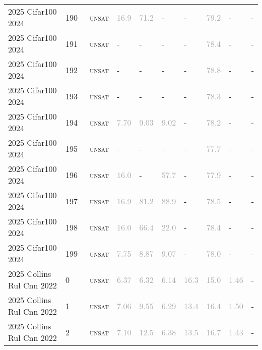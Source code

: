 \begin{center}
{\begin{longtable}{@{}llllllllll@{}}
2025 Cifar100 2024 & 190 & ~\textsc{unsat} & \textcolor{darkgray}{16.9} & \textcolor{darkgray}{71.2} & - & - & \textcolor{darkgray}{79.2} & - & - \\
2025 Cifar100 2024 & 191 & ~\textsc{unsat} & - & - & - & - & \textcolor{darkgray}{78.4} & - & - \\
2025 Cifar100 2024 & 192 & ~\textsc{unsat} & - & - & - & - & \textcolor{darkgray}{78.8} & - & - \\
2025 Cifar100 2024 & 193 & ~\textsc{unsat} & - & - & - & - & \textcolor{darkgray}{78.3} & - & - \\
2025 Cifar100 2024 & 194 & ~\textsc{unsat} & \textcolor{darkgray}{7.70} & \textcolor{darkgray}{9.03} & \textcolor{darkgray}{9.02} & - & \textcolor{darkgray}{78.2} & - & - \\
2025 Cifar100 2024 & 195 & ~\textsc{unsat} & - & - & - & - & \textcolor{darkgray}{77.7} & - & - \\
2025 Cifar100 2024 & 196 & ~\textsc{unsat} & \textcolor{darkgray}{16.0} & - & \textcolor{darkgray}{57.7} & - & \textcolor{darkgray}{77.9} & - & - \\
2025 Cifar100 2024 & 197 & ~\textsc{unsat} & \textcolor{darkgray}{16.9} & \textcolor{darkgray}{81.2} & \textcolor{darkgray}{88.9} & - & \textcolor{darkgray}{78.5} & - & - \\
2025 Cifar100 2024 & 198 & ~\textsc{unsat} & \textcolor{darkgray}{16.0} & \textcolor{darkgray}{66.4} & \textcolor{darkgray}{22.0} & - & \textcolor{darkgray}{78.4} & - & - \\
2025 Cifar100 2024 & 199 & ~\textsc{unsat} & \textcolor{darkgray}{7.75} & \textcolor{darkgray}{8.87} & \textcolor{darkgray}{9.07} & - & \textcolor{darkgray}{78.0} & - & - \\
\midrule
2025 Collins Rul Cnn 2022 & 0 & ~\textsc{unsat} & \textcolor{darkgray}{6.37} & \textcolor{darkgray}{6.32} & \textcolor{darkgray}{6.14} & \textcolor{darkgray}{16.3} & \textcolor{darkgray}{15.0} & \textcolor{darkgray}{1.46} & - \\
2025 Collins Rul Cnn 2022 & 1 & ~\textsc{unsat} & \textcolor{darkgray}{7.06} & \textcolor{darkgray}{9.55} & \textcolor{darkgray}{6.29} & \textcolor{darkgray}{13.4} & \textcolor{darkgray}{16.4} & \textcolor{darkgray}{1.50} & - \\
2025 Collins Rul Cnn 2022 & 2 & ~\textsc{unsat} & \textcolor{darkgray}{7.10} & \textcolor{darkgray}{12.5} & \textcolor{darkgray}{6.38} & \textcolor{darkgray}{13.5} & \textcolor{darkgray}{16.7} & \textcolor{darkgray}{1.43} & - \\

\end{longtable}}
\end{center}
